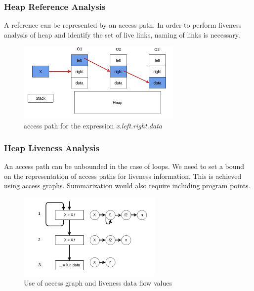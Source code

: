 \documentclass{beamer}
\begin{document}
\begin{frame}
\frametitle{Heap Reference Analysis}

A reference can be represented by an access path. In order to perform liveness analysis of heap and identify the set of live links, naming of links is necessary.


	\begin{figure}[here]
		\begin{center}
			\includegraphics[width=8cm]{Figures/hra_access_path.png}
		\end{center}
		\caption{access path for the expression \emph{x.left.right.data}}
		\label{fig:accpath}
	\end{figure}

\end{frame}

\begin{frame}
\frametitle{Heap Liveness Analysis}

An access path can be unbounded in the case of loops. We need to set a bound on the representation of access paths for liveness information. This is achieved using access graphs. Summarization would also require including program points.

\begin{figure}[here]
	\begin{center}
		\includegraphics[width=7cm]{Figures/heap_summarization_liveness.png}
	\end{center}
	\caption{Use of access graph and liveness data flow values}
	\label{fig:accpath}
\end{figure}

\end{frame}
\end{document}
